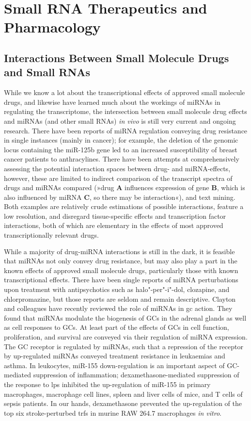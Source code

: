 \section{Small RNA Therapeutics and Pharmacology} \label{sec:discussion:therapy}
\subsection{Interactions Between Small Molecule Drugs and Small RNAs}
While we know a lot about the transcriptional effects of approved small molecule drugs, and likewise have learned much about the workings of miRNAs in regulating the transcriptome, the intersection between small molecule drug effects and miRNAs (and other small RNAs) \emph{in vivo} is still very current and ongoing research. There have been reports of miRNA regulation conveying drug resistance in single instances (mainly in cancer);\cite{Ma2010} for example, the deletion of the genomic locus containing the miR-125b gene led to an increased susceptibility of breast cancer patients to anthracylines.\cite{Climent2007} There have been attempts at comprehensively assessing the potential interaction spaces between drug- and miRNA-effects,\cite{Meng2016, Xie2019} however, these are limited to indirect comparison of the transcript spectra of drugs and miRNAs compared (»drug \textbf{A} influences expression of gene \textbf{B}, which is also influenced by miRNA \textbf{C}, so there may be interaction«), and text mining. Both examples are relatively crude estimations of possible interactions, feature a low resolution, and disregard tissue-specific effects and transcription factor interactions, both of which are elementary in the effects of most approved transcriptionally relevant drugs.\cite{Clayton2018}

While a majority of drug-miRNA interactions is still in the dark, it is feasible that miRNAs not only convey drug resistance, but may also play a part in the known effects of approved small molecule drugs, particularly those with known transcriptional effects. There have been single reports of miRNA perturbations upon treatment with antipsychotics such as halo"-per"-i"-dol, clozapine, and chlorpromazine, but those reports are seldom and remain descriptive.\cite{Gardiner2014} Clayton and colleagues have recently reviewed the role of miRNAs in \acf{gc} action.\cite{Clayton2018} They found that miRNAs modulate the biogenesis of GCs in the adrenal glands as well as cell responses to GCs. At least part of the effects of GCs in cell function, proliferation, and survival are conveyed via their regulation of miRNA expression. The GC receptor is regulated by miRNAs, such that a repression of the receptor by up-regulated miRNAs conveyed treatment resistance in leukaemias and asthma. In leukocytes, miR-155 down-regulation is an important aspect of GC-mediated suppression of inflammation; dexamethasone-mediated suppression of the response to \acf{lps} inhibited the up-regulation of miR-155 in primary macrophages, macrophage cell lines, spleen and liver cells of mice, and T cells of sepsis patients.\cite{Clayton2018} In our hands, dexamethasone prevented the up-regulation of the top six stroke-perturbed \acfp{trf} in murine RAW 264.7 macrophages \emph{in vitro}.\cite{Winek2020}

